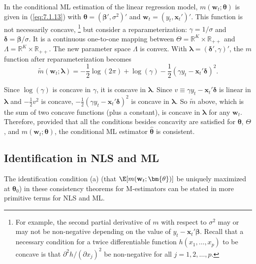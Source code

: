 \begin{example}
\label{ex:7.7}
In the conditional ML estimation of the linear regression model, $m(\mathbf{w}_t; \bm{\theta})$ is given in (\ref{eq:7.1.13}) with $\bm{\theta} = (\bm{\beta}', \sigma^2)'$ and $\mathbf{w}_t = (y_t, \mathbf{x}_t')'$. This function is not necessarily concave,%
\footnote{For example, the second partial derivative of $m$ with respect to $\sigma^2$ may or may not be non-negative depending on the value of $y_t - \mathbf{x}_t' \bm{\beta}$. Recall that a necessary condition for a twice differentiable function $h(x_1, \ldots, x_p)$ to be concave is that $\partial^2 h / (\partial x_j)^2$ be non-negative for all $j = 1, 2, \ldots, p$.}
but consider a reparameterization: $\gamma = 1/\sigma$ and $\bm{\delta} = \bm{\beta}/\sigma$. It is a continuous one-to-one mapping between $\Theta = \mathbb{R}^K \times \mathbb{R}_{++}$ and $\Lambda = \mathbb{R}^K \times \mathbb{R}_{++}$. The new parameter space $\Lambda$ is convex. With $\bm{\lambda} = (\bm{\delta}', \gamma)'$, the $m$ function after reparameterization becomes
\begin{equation}
\label{eq:7.2.7}
\widetilde{m}(\mathbf{w}_t; \bm{\lambda}) = -\frac{1}{2}\log(2\pi) + \log(\gamma) - \frac{1}{2}(\gamma y_t - \mathbf{x}_t' \bm{\delta})^2.
\end{equation}

Since $\log(\gamma)$ is concave in $\gamma$, it is concave in $\bm{\lambda}$. Since $v \equiv \gamma y_t - \mathbf{x}_t' \bm{\delta}$ is linear in $\bm{\lambda}$ and $-\frac{1}{2}v^2$ is concave, $-\frac{1}{2}(\gamma y_t - \mathbf{x}_t' \bm{\delta})^2$ is concave in $\bm{\lambda}$. So $\widetilde{m}$ above, which is the sum of two concave functions (plus a constant), is concave in $\bm{\lambda}$ for any $\mathbf{w}_t$. Therefore, provided that all the conditions besides concavity are satisfied for $\bm{\theta}$, $\Theta$, and $m(\mathbf{w}_t; \bm{\theta})$, the conditional ML estimator $\hat{\bm{\theta}}$ is consistent.
\end{example}

\subsection*{Identification in NLS and ML}

The identification condition (a) (that $\E[m(\mathbf{w}_t; \bm{\theta})]$ be uniquely maximized at $\bm{\theta}_0$) in these consistency theorems for M-estimators can be stated in more primitive terms for NLS and ML.

